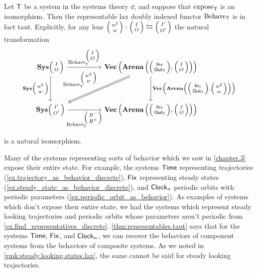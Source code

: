 \documentclass[DynamicalBook]{subfiles}
\begin{document}
\begin{theorem}\label{thm:representables.taut}
Let $\mathsf{T}$ be a system in the systems theory $\dd$, and suppose that $\mathrm{expose}_{\mathsf{T}}$
is an isomorphism. Then the representable lax doubly indexed functor
$\mathrm{Behave}_{\mathsf{T}}$ is in fact taut. Explicitly, for any lens
$\lens{w^{\sharp}}{w} : \lens{I}{O} \fromto \lens{I'}{O'}$ the natural transformation
  \[
    \begin{tikzcd}
\Cat{Sys}\lens{I}{O} \ar[dd, "{\Cat{Sys}\littlelens{w^{\sharp}}{w}}"'] \ar[rr, "{\Fun{Behave}_{\Sys{T}}^{\littlelens{I}{O}}}"] & & \Cat{Vec}\left( \Cat{Arena}\left(
    \littlelens{\In{T}}{\Out{T}}, \littlelens{I}{O} \right) \right) \ar[dd, "{\Cat{Vec}\left(
  \Cat{Arena}\left( \littlelens{\In{T}}{\Out{T}}, \littlelens{w^{\sharp}}{w}
  \right)\right)}"] \ar[ddll, Rightarrow, "{\Fun{Behave}_{\Sys{T}}^{\littlelens{w^{\sharp}}{w}}}"']\\
 & & \\
\Cat{Sys}\lens{I'}{O'}  \ar[rr, "{\Fun{Behave}_{\Sys{T}}^{\littlelens{B^-}{B^+}} }"']& & \Cat{Vec}\left( \Cat{Arena}\left(
    \littlelens{\In{T}}{\Out{T}}, \littlelens{I}{O} \right) \right) \\
    \end{tikzcd}
\]
is a natural isomorphism.
\end{theorem}

Many of the systems representing sorts of behavior which we saw in
\cref{chapter.3} expose their entire state. For example, the systems $\mathsf{Time}$
representing trajectories (\cref{ex.trajectory_as_behavior_discrete}), $\mathsf{Fix}$ representing steady
states (\cref{ex.steady_state_as_behavior_discrete}), and $\mathsf{Clock}_n$ periodic orbits with periodic parameters (\cref{ex.periodic_orbit_as_behavior}). As examples of
systems which don't expose their entire state, we had the systems which
represent steady looking trajectories and periodic orbits whose parameters
aren't periodic from \cref{ex.find_representatives_discrete}.
\cref{thm:representables.taut} says that for the systems $\mathsf{Time}$,
$\mathsf{Fix}$, and $\mathsf{Clock}_n$, we can recover the behaviors of component
systems from the behaviors of composite systems. As we noted in
\cref{rmk:steady.looking.states.lax}, the same cannot be said for steady looking trajectories.
\end{document}
